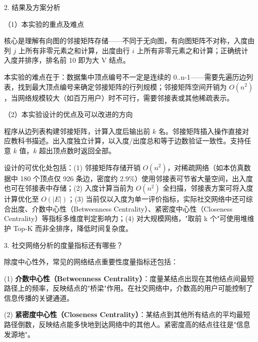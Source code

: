 \noindent\hspace*{2em}2. 结果及方案分析\par
\noindent\hspace*{2em}（1）本实验的重点及难点\par
\noindent\hspace*{2em}核心是理解有向图的邻接矩阵存储——不同于无向图，有向图矩阵不对称，入度由列 $j$ 上所有非零元素之和计算，出度由行 $i$ 上所有非零元素之和计算；正确统计入度并排序，排名前 10 即为大 V 结点。\par
\noindent\hspace*{2em}本实验的难点在于：数据集中顶点编号不一定是连续的 0..n-1——需要先遍历边列表，找到最大顶点编号来确定邻接矩阵的行列规模；邻接矩阵空间开销为 $O(n^2)$，当网络规模较大（如百万用户）时不可行，需要邻接表或其他稀疏表示。\par
\noindent\hspace*{2em}（2）本实验设计的优点及可以改进的方向\par
\noindent\hspace*{2em}程序从边列表构建邻接矩阵，计算入度后输出前 $k$ 名。邻接矩阵插入操作直接对应教科书描述。出入度独立计算，以入度/出度总和等于边数验证一致性。支持任意 $k$ 值，$k$ 超出顶点数时返回全部。\par
\noindent\hspace*{2em}设计的可优化处包括：(1) 邻接矩阵存储开销 $O(n^2)$，对稀疏网络（如本仿真数据中 180 个顶点仅 926 条边，密度约 2.9\%）使用邻接表可节省大量空间，出入度也可在邻接表中存储；(2) 入度计算当前为 $O(n^2)$ 全扫描，邻接表方案可将入度计算优化至 $O(|E|)$；(3) 当前仅以入度为单一评价指标，实际社交网络中还可综合出度、介数中心性（Betweenness Centrality）、紧密度中心性（Closeness Centrality）等指标多维度判定影响力；(4) 对大规模网络，"取前 k 个"可使用堆维护 Top-K 而非全排序，降低时间复杂度。\par
\noindent\hspace*{2em}3. 社交网络分析的度量指标还有哪些？\par
\noindent\hspace*{2em}除度中心性外，常见的网络结点重要性度量指标还包括：\par
\noindent\hspace*{2em}(1) \textbf{介数中心性（Betweenness Centrality）}：度量某结点出现在其他结点间最短路径上的频率，反映结点的"桥梁"作用。在社交网络中，介数高的用户可能控制了信息传播的关键通道。\par
\noindent\hspace*{2em}(2) \textbf{紧密度中心性（Closeness Centrality）}：某结点到其他所有结点的平均最短路径倒数，反映结点能多快地到达网络中的其他人。紧密度高的结点往往是"信息发源地"。\par
